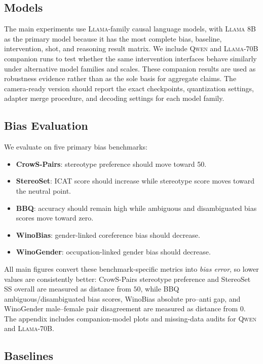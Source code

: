 \documentclass[11pt]{article}
\newcommand{\llama}{\textsc{Llama}}
\newcommand{\qwen}{\textsc{Qwen}}
\begin{document}
\subsection{Models}
\label{sec:models}

The main experiments use \llama{}-family causal language models, with \llama{} 8B as the primary model because it has the most complete bias, baseline, intervention, shot, and reasoning result matrix. We include \qwen{} and \llama{}-70B companion runs to test whether the same intervention interfaces behave similarly under alternative model families and scales. These companion results are used as robustness evidence rather than as the sole basis for aggregate claims. The camera-ready version should report the exact checkpoints, quantization settings, adapter merge procedure, and decoding settings for each model family.

\subsection{Bias Evaluation}
\label{sec:bias-eval}

We evaluate on five primary bias benchmarks:
\begin{itemize}[leftmargin=1.4em,itemsep=1pt,topsep=2pt]
    \item \textbf{CrowS-Pairs}: stereotype preference should move toward 50.
    \item \textbf{StereoSet}: ICAT score should increase while stereotype score moves toward the neutral point.
    \item \textbf{BBQ}: accuracy should remain high while ambiguous and disambiguated bias scores move toward zero.
    \item \textbf{WinoBias}: gender-linked coreference bias should decrease.
    \item \textbf{WinoGender}: occupation-linked gender bias should decrease.
\end{itemize}
All main figures convert these benchmark-specific metrics into \emph{bias error}, so lower values are consistently better: CrowS-Pairs stereotype preference and StereoSet SS overall are measured as distance from $50$, while BBQ ambiguous/disambiguated bias scores, WinoBias absolute pro--anti gap, and WinoGender male--female pair disagreement are measured as distance from $0$. The appendix includes companion-model plots and missing-data audits for \qwen{} and \llama{}-70B.

\subsection{Baselines}
\label{sec:baselines}
\end{document}
